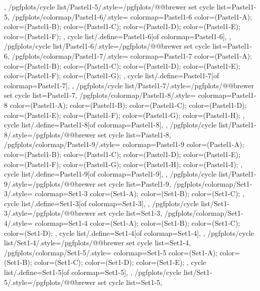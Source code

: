 {{  },
  /pgfplots/cycle list/Pastel1-5/.style={/pgfplots/@@brewer set cycle list={Pastel1-5}},
  /pgfplots/colormap/Pastel1-6/.style={
    colormap={Pastel1-6}{
      color=(Pastel1-A);
      color=(Pastel1-B);
      color=(Pastel1-C);
      color=(Pastel1-D);
      color=(Pastel1-E);
      color=(Pastel1-F);
    },
    cycle list/.define={Pastel1-6}{[of colormap=Pastel1-6]},
  },
  /pgfplots/cycle list/Pastel1-6/.style={/pgfplots/@@brewer set cycle list={Pastel1-6}},
  /pgfplots/colormap/Pastel1-7/.style={
    colormap={Pastel1-7}{
      color=(Pastel1-A);
      color=(Pastel1-B);
      color=(Pastel1-C);
      color=(Pastel1-D);
      color=(Pastel1-E);
      color=(Pastel1-F);
      color=(Pastel1-G);
    },
    cycle list/.define={Pastel1-7}{[of colormap=Pastel1-7]},
  },
  /pgfplots/cycle list/Pastel1-7/.style={/pgfplots/@@brewer set cycle list={Pastel1-7}},
  /pgfplots/colormap/Pastel1-8/.style={
    colormap={Pastel1-8}{
      color=(Pastel1-A);
      color=(Pastel1-B);
      color=(Pastel1-C);
      color=(Pastel1-D);
      color=(Pastel1-E);
      color=(Pastel1-F);
      color=(Pastel1-G);
      color=(Pastel1-H);
    },
    cycle list/.define={Pastel1-8}{[of colormap=Pastel1-8]},
  },
  /pgfplots/cycle list/Pastel1-8/.style={/pgfplots/@@brewer set cycle list={Pastel1-8}},
  /pgfplots/colormap/Pastel1-9/.style={
    colormap={Pastel1-9}{
      color=(Pastel1-A);
      color=(Pastel1-B);
      color=(Pastel1-C);
      color=(Pastel1-D);
      color=(Pastel1-E);
      color=(Pastel1-F);
      color=(Pastel1-G);
      color=(Pastel1-H);
      color=(Pastel1-I);
    },
    cycle list/.define={Pastel1-9}{[of colormap=Pastel1-9]},
  },
  /pgfplots/cycle list/Pastel1-9/.style={/pgfplots/@@brewer set cycle list={Pastel1-9}},
  /pgfplots/colormap/Set1-3/.style={
    colormap={Set1-3}{
      color=(Set1-A);
      color=(Set1-B);
      color=(Set1-C);
    },
    cycle list/.define={Set1-3}{[of colormap=Set1-3]},
  },
  /pgfplots/cycle list/Set1-3/.style={/pgfplots/@@brewer set cycle list={Set1-3}},
  /pgfplots/colormap/Set1-4/.style={
    colormap={Set1-4}{
      color=(Set1-A);
      color=(Set1-B);
      color=(Set1-C);
      color=(Set1-D);
    },
    cycle list/.define={Set1-4}{[of colormap=Set1-4]},
  },
  /pgfplots/cycle list/Set1-4/.style={/pgfplots/@@brewer set cycle list={Set1-4}},
  /pgfplots/colormap/Set1-5/.style={
    colormap={Set1-5}{
      color=(Set1-A);
      color=(Set1-B);
      color=(Set1-C);
      color=(Set1-D);
      color=(Set1-E);
    },
    cycle list/.define={Set1-5}{[of colormap=Set1-5]},
  },
  /pgfplots/cycle list/Set1-5/.style={/pgfplots/@@brewer set cycle list={Set1-5}},
}

